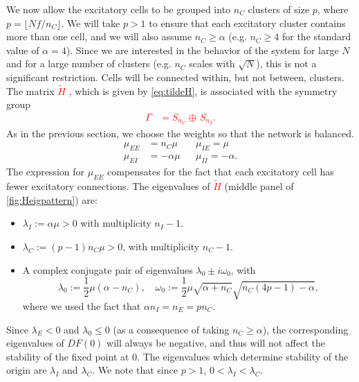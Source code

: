 \documentclass[reqno]{siamonline190516}
\newcommand{\revised}[1]{ \textcolor{red}{#1} }
\begin{document}
We now allow the excitatory cells to be grouped into $n_C$ clusters of size $p$, where $p = \lfloor N f/n_C \rfloor$. We will take $p > 1$ to ensure that each excitatory cluster contains more than one cell, and we will also assume $n_C \geq \alpha$ (e.g. $n_C \geq 4$ for the standard value of $\alpha = 4$). Since we are interested in the behavior of the system for large $N$ and for a large number of clusters (e.g. $n_C$ scales with $\sqrt{N}$), this is not a significant restriction. Cells will be connected within, but not between, clusters. The matrix \revised{$\tilde{H}$}, which is given by \cref{eq:tildeH}, is associated with the symmetry group
\revised{
\begin{align*}
\Gamma &= S_{n_C} \oplus \, S_{n_I}.
\end{align*}
}
As in the previous section, we choose the weights so that the network is balanced. 
\begin{align*}
\mu_{EE} &= n_C \mu && \mu_{IE} = \mu \\
\mu_{EI} &= -\alpha \mu && \mu_{II} = -\alpha.
\end{align*}
The expression for $\mu_{EE}$ compensates for the fact that each excitatory cell has fewer excitatory connections. The eigenvalues of \revised{$\tilde{H}$} (middle panel of \cref{fig:Heigpattern}) are:
\begin{itemize}
\item $\lambda_I := \alpha \mu > 0$ with multiplicity $n_I - 1$.
\item $\lambda_C := (p-1) n_C \mu > 0$, with multiplicity $n_C - 1$.
\item A complex conjugate pair of eigenvalues $\lambda_0 \pm i \omega_0$, with 
\begin{equation*}
    \lambda_0 := \frac{1}{2}\mu(\alpha - n_C), \quad 
    \omega_0 := \frac{1}{2}\mu \sqrt{ \alpha + n_C} \sqrt{ n_C(4 p - 1) - \alpha },
\end{equation*}
where we used the fact that $\alpha n_I = n_E = p n_C$.
\end{itemize}
Since $\lambda_E < 0$ and $\lambda_0 \leq 0$ (as a consequence of taking $n_C \geq \alpha$), the corresponding eigenvalues of $DF(0)$ will always be negative, and thus will not affect the stability of the fixed point at 0. The eigenvalues which determine stability of the origin are $\lambda_I$ and $\lambda_C$. We note that since $p > 1$, $0 < \lambda_I < \lambda_C$.
\end{document}
